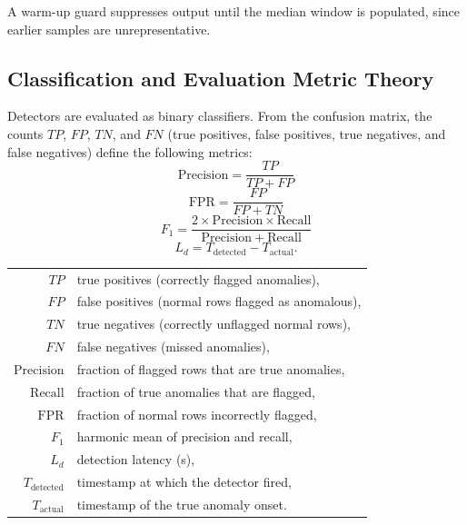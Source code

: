 \vspace{0.5em}
A warm-up guard suppresses output until the median window is populated, since earlier samples are unrepresentative.

\subsection{Classification and Evaluation Metric Theory}

Detectors are evaluated as binary classifiers. From the confusion matrix, the counts $TP$, $FP$, $TN$, and $FN$ (true positives, false positives, true negatives, and false negatives) define the following metrics:
%
\begin{equation}
\mathrm{Precision} = \frac{TP}{TP + FP}
\label{eq:precision-ch3}
\end{equation}
\begin{equation}
\mathrm{FPR} = \frac{FP}{FP + TN}
\label{eq:fpr-ch3}
\end{equation}
\begin{equation}
F_1 = \frac{2 \times \mathrm{Precision} \times \mathrm{Recall}}{\mathrm{Precision} + \mathrm{Recall}}
\label{eq:f1-ch3}
\end{equation}
%
\begin{equation}
L_d = T_{\mathrm{detected}} - T_{\mathrm{actual}}.
\label{eq:latency-metric-ch3}
\end{equation}
\begin{tabular}{@{}r@{~=~}l@{}}
$TP$ & true positives (correctly flagged anomalies), \\
$FP$ & false positives (normal rows flagged as anomalous), \\
$TN$ & true negatives (correctly unflagged normal rows), \\
$FN$ & false negatives (missed anomalies), \\
$\mathrm{Precision}$ & fraction of flagged rows that are true anomalies, \\
$\mathrm{Recall}$ & fraction of true anomalies that are flagged, \\
$\mathrm{FPR}$ & fraction of normal rows incorrectly flagged, \\
$F_1$ & harmonic mean of precision and recall, \\
$L_d$ & detection latency (s), \\
$T_{\mathrm{detected}}$ & timestamp at which the detector fired, \\
$T_{\mathrm{actual}}$ & timestamp of the true anomaly onset.
\end{tabular}

